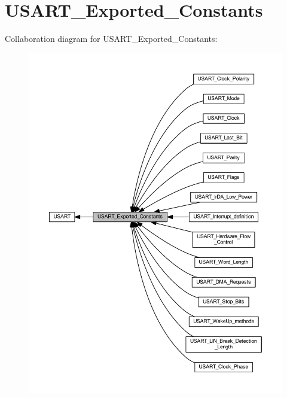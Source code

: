 \hypertarget{group___u_s_a_r_t___exported___constants}{}\section{U\+S\+A\+R\+T\+\_\+\+Exported\+\_\+\+Constants}
\label{group___u_s_a_r_t___exported___constants}
Collaboration diagram for U\+S\+A\+R\+T\+\_\+\+Exported\+\_\+\+Constants\+:
\nopagebreak
\begin{figure}[H]
\begin{center}
\leavevmode
\includegraphics[width=350pt]{group___u_s_a_r_t___exported___constants}
\end{center}
\end{figure}
